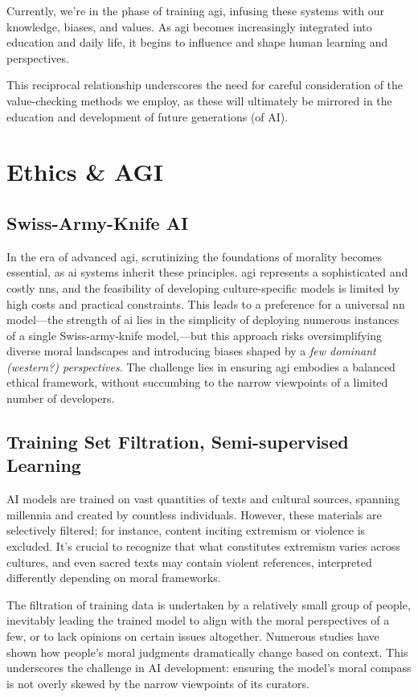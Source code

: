 \documentclass[11pt,a4]{article}
\begin{document}
Currently,
    we're in the phase of training \acrshort{agi}, infusing these
    systems with our knowledge, biases, and values.
    As \acrshort{agi} becomes increasingly integrated into
    education and daily life, it begins to influence and shape
    human learning and perspectives.

    This reciprocal relationship underscores the need for
    careful consideration of the value-checking methods
    we employ, as these will ultimately be mirrored in
    the education and development of future generations (of AI).



\section{Ethics \& AGI}






\subsection{Swiss-Army-Knife AI}
In the era of advanced \acrshort{agi}, scrutinizing the foundations of
morality becomes essential, as \acrshort{ai} systems inherit
these principles.
\acrshort{agi} represents a sophisticated and costly \glspl{nn}, and
the feasibility of developing culture-specific models is
limited by high costs and practical constraints. This leads
to a preference for a universal \acrshort{nn} model---the
strength of \acrshort{ai} lies in the simplicity of deploying numerous
instances of a single Swiss-army-knife  model,---but this approach
risks oversimplifying diverse moral landscapes and
introducing biases shaped by a \textit{few dominant
(western?) perspectives}. The challenge lies in
ensuring \acrshort{agi} embodies a balanced ethical framework,
without succumbing to the narrow viewpoints of a limited number of developers.
\subsection{Training Set Filtration, Semi-supervised Learning}
AI models are trained on vast quantities of texts and cultural sources,
spanning millennia and created by countless individuals. However,
these materials are selectively filtered; for instance, content
inciting extremism or violence is excluded. It's crucial to
recognize that what constitutes extremism varies across cultures,
and even sacred texts may contain violent references, interpreted
differently depending on moral frameworks.
\par
The filtration of training data is undertaken by a relatively
small group of people, inevitably leading the trained model
to align with the moral perspectives of a few, or to lack
opinions on certain issues altogether.
Numerous studies have shown how people's moral judgments
dramatically change based on context. This underscores the
challenge in AI development: ensuring the model's moral
compass is not overly skewed by the narrow
viewpoints of its curators.
\end{document}
